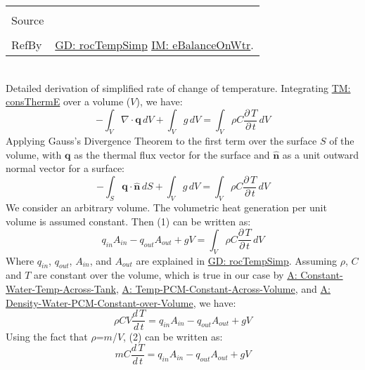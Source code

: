 \documentclass[12pt]{article}
\begin{document}
\begin{minipage}{\textwidth}
\begin{tabular}{p{} p{}}
\\ \midrule \\
Source & 
\\ \midrule \\
RefBy & \hyperref[GD:rocTempSimp]{GD: rocTempSimp} \hyperref[IM:eBalanceOnWtr]{IM: eBalanceOnWtr}.
\\ \bottomrule \end{tabular}
\end{minipage}\\
Detailed derivation of simplified rate of change of temperature.
Integrating \hyperref[TM:consThermE]{TM: consThermE} over a volume ($V$), we have:
\begin{dmath}
-\int_{V}{∇\cdot{}\mathbf{q}}\,dV+\int_{V}{g}\,dV=\int_{V}{ρ C \frac{\partial{}\,T}{\partial{}\,t}}\,dV
\end{dmath}
Applying Gauss's Divergence Theorem to the first term over the surface $S$ of the volume, with $\mathbf{q}$ as the thermal flux vector for the surface and $\mathbf{\hat{n}}$ as a unit outward normal vector for a surface:
\begin{dmath}
-\int_{S}{\mathbf{q}\cdot{}\mathbf{\hat{n}}}\,dS+\int_{V}{g}\,dV=\int_{V}{ρ C \frac{\partial{}\,T}{\partial{}\,t}}\,dV
\end{dmath}
We consider an arbitrary volume. The volumetric heat generation per unit volume is assumed constant. Then (1) can be written as:
\begin{dmath}
{q_{in}} {A_{in}}-{q_{out}} {A_{out}}+g V=\int_{V}{ρ C \frac{\partial{}\,T}{\partial{}\,t}}\,dV
\end{dmath}
Where ${q_{in}}$, ${q_{out}}$, ${A_{in}}$, and ${A_{out}}$ are explained in \hyperref[GD:rocTempSimp]{GD: rocTempSimp}. Assuming $ρ$, $C$ and $T$ are constant over the volume, which is true in our case by \hyperref[A:Constant-Water-Temp-Across-Tank]{A: Constant-Water-Temp-Across-Tank}, \hyperref[A:Temp-PCM-Constant-Across-Volume]{A: Temp-PCM-Constant-Across-Volume}, and \hyperref[A:Density-Water-PCM-Constant-over-Volume]{A: Density-Water-PCM-Constant-over-Volume}, we have:
\begin{dmath}
ρ C V \frac{d\,T}{d\,t}={q_{in}} {A_{in}}-{q_{out}} {A_{out}}+g V
\end{dmath}
Using the fact that $ρ$=$m$/$V$, (2) can be written as:
\begin{dmath}
m C \frac{d\,T}{d\,t}={q_{in}} {A_{in}}-{q_{out}} {A_{out}}+g V
\end{dmath}
\end{document}
